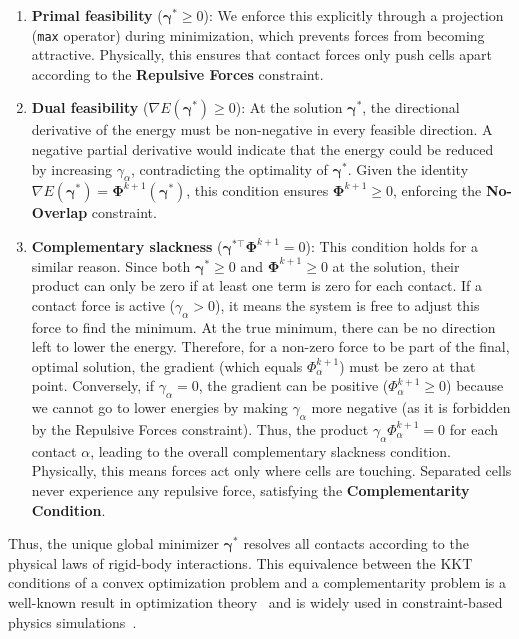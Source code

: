 \documentclass[conference]{IEEEtran}
\begin{document}
\begin{enumerate}
    \item \textbf{Primal feasibility} ($\boldsymbol{\gamma}^* \geq 0$): We enforce this explicitly through a projection (\texttt{max} operator) during minimization, which prevents forces from becoming attractive. Physically, this ensures that contact forces only push cells apart according to the \textbf{Repulsive Forces} constraint.

    \item \textbf{Dual feasibility} ($\nabla E(\boldsymbol{\gamma}^*) \geq 0$): At the solution $\boldsymbol{\gamma}^*$, the directional derivative of the energy must be non-negative in every feasible direction. A negative partial derivative would indicate that the energy could be reduced by increasing $\gamma_\alpha$, contradicting the optimality of $\boldsymbol{\gamma}^*$. Given the identity $\nabla E(\boldsymbol{\gamma}^*) = \boldsymbol{\Phi}^{k+1}(\boldsymbol{\gamma}^*)$, this condition ensures $\boldsymbol{\Phi}^{k+1} \geq 0$, enforcing the \textbf{No-Overlap} constraint.

    \item \textbf{Complementary slackness} ($\boldsymbol{\gamma}^{*\top} \boldsymbol{\Phi}^{k+1} = 0$): This condition holds for a similar reason. Since both $\boldsymbol{\gamma}^* \geq 0$ and $\boldsymbol{\Phi}^{k+1} \geq 0$ at the solution, their product can only be zero if at least one term is zero for each contact. If a contact force is active ($\gamma_\alpha > 0$), it means the system is free to adjust this force to find the minimum. At the true minimum, there can be no direction left to lower the energy. Therefore, for a non-zero force to be part of the final, optimal solution, the gradient (which equals $\Phi^{k+1}_\alpha$) must be zero at that point. Conversely, if $\gamma_\alpha = 0$, the gradient can be positive ($\Phi^{k+1}_\alpha \geq 0$) because we cannot go to lower energies by making $\gamma_\alpha$ more negative (as it is forbidden by the Repulsive Forces constraint). Thus, the product $\gamma_\alpha \Phi^{k+1}_\alpha = 0$ for each contact $\alpha$, leading to the overall complementary slackness condition. Physically, this means forces act only where cells are touching. Separated cells never experience any repulsive force, satisfying the \textbf{Complementarity Condition}.
\end{enumerate}

Thus, the unique global minimizer $\boldsymbol{\gamma}^*$ resolves all contacts according to the physical laws of rigid-body interactions. This equivalence between the KKT conditions of a convex optimization problem and a complementarity problem is a well-known result in optimization theory~\cite{Nocedal2006} and is widely used in constraint-based physics simulations~\cite{Yan2022,Tasora2008, Yan2019, Li2021, Weady2024SM,Rudge2012,Macklin2014,Ferguson2021,CellModellerMaths}.
\end{document}
